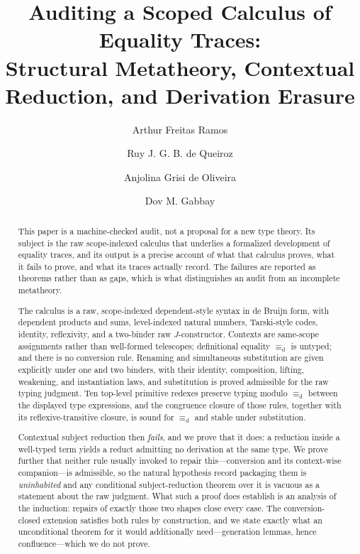 \documentclass[10pt,reqno]{amsart}
\title[Auditing a Scoped Calculus of Equality Traces]
  {Auditing a Scoped Calculus of Equality Traces:\\
   Structural Metatheory, Contextual Reduction,
   and Derivation Erasure}
\author{Arthur Freitas Ramos}
\author{Ruy J. G. B. de Queiroz}
\author{Anjolina Grisi de Oliveira}
\author{Dov M. Gabbay}
\newcommand{\defeq}{\mathrel{\equiv_{\mathrm d}}}
\begin{document}
\begin{abstract}
This paper is a machine-checked audit, not a proposal for a new type theory.
Its subject is the raw
scope-indexed calculus that underlies a formalized development of equality
traces, and its output is a precise account of what that calculus proves, what
it fails to prove, and what its traces actually record.  The failures are
reported as theorems rather than as gaps, which is what distinguishes an audit
from an incomplete metatheory.

The calculus is a raw, scope-indexed dependent-style syntax in de Bruijn form,
with dependent products and sums, level-indexed natural numbers, Tarski-style
codes, identity, reflexivity, and a two-binder raw \(J\)-constructor.  Contexts
are same-scope assignments rather than well-formed telescopes; definitional
equality \(\defeq\) is untyped; and there is no conversion rule.  Renaming and
simultaneous substitution are given explicitly under one and two binders, with
their identity, composition, lifting, weakening, and instantiation laws, and
substitution is proved admissible for the raw typing judgment.  Ten top-level
primitive redexes preserve typing modulo \(\defeq\) between the displayed type
expressions, and the congruence closure of those rules, together with its
reflexive-transitive closure, is sound for \(\defeq\) and stable under
substitution.

Contextual subject reduction then \emph{fails}, and we prove that it does: a
reduction inside a well-typed term yields a reduct admitting no derivation at
the same type.  We prove further that neither rule usually invoked to repair
this---conversion and its context-wise companion---is admissible, so the natural
hypothesis record packaging them is \emph{uninhabited} and any conditional
subject-reduction theorem over it is vacuous as a statement about the raw
judgment.  What such a proof does establish is an analysis of the induction:
repairs of exactly those two shapes close every case.  The conversion-closed
extension satisfies both rules by construction, and we state exactly what an
unconditional theorem for it would additionally need---generation lemmas, hence
confluence---which we do not prove.


\end{abstract}
\end{document}
